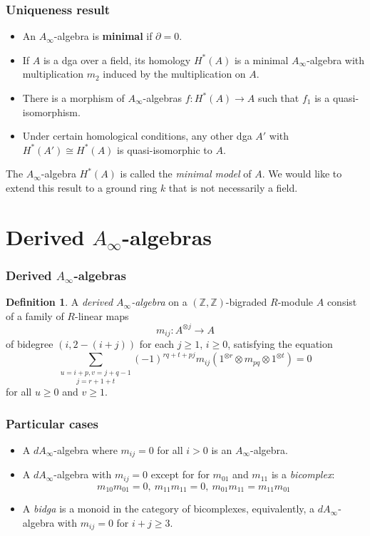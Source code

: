 \documentclass{beamer}
\theoremstyle{definition}
\newtheorem{defi}{Definition}
\newcommand{\Z}{\mathbb{Z}}
\begin{document}
\begin{frame}
\frametitle{Uniqueness result}
\begin{itemize}
\item An $A_\infty$-algebra is \textbf{minimal} if $\partial = 0$. 
\end{itemize}\pause
\begin{theorem}[Kadeishvili]
\begin{itemize}
\item If $A$ is a dga over a field, its homology $H^*(A)$ is a minimal $A_\infty$-algebra with multiplication $m_2$ induced by the multiplication on $A$.
\item There is a morphism of $A_\infty$-algebras $f:H^*(A)\to A$ such that $f_1$ is a quasi-isomorphism.
\item Under certain homological conditions, any other dga $A'$ with $H^*(A')\cong H^*(A)$ is quasi-isomorphic to $A$. 
\end{itemize}
\end{theorem}\pause
The $A_\infty$-algebra $H^*(A)$ is called the \emph{minimal model} of $A$.
We would like to extend this result to a ground ring $k$ that is not necessarily a field.
\end{frame}

\section{Derived $A_\infty$-algebras}

\begin{frame}
\frametitle{Derived $A_\infty$-algebras}
\begin{defi}
  A \emph{derived $A_\infty$-algebra} on a $(\Z,\Z)$-bigraded $R$-module $A$ consist of a family of $R$-linear maps 
\[m_{ij}:A^{\otimes j}\to A\]
of bidegree $(i,2-(i+j))$ for each $j\geq 1$, $i\geq 0$, satisfying the equation
\begin{equation}
\underset{j=r+1+t}{\sum_{u=i+p, v=j+q-1}}(-1)^{rq+t+pj}m_{ij}(1^{\otimes r}\otimes m_{pq}\otimes 1^{\otimes t})=0
\end{equation}
for all $u\geq 0$ and $v\geq 1$. 
\end{defi}
\end{frame}

\begin{frame}
\frametitle{Particular cases}
\begin{itemize}
\item<1-> A $dA_\infty$-algebra where $m_{ij}=0$ for all $i>0$ is an $A_\infty$-algebra.
\item<2-> A $dA_\infty$-algebra with $m_{ij}=0$ except for for $m_{01}$ and $m_{11}$ is a \emph{bicomplex}: 
\[m_{10}m_{01}=0,\ m_{11}m_{11}=0,\ m_{01}m_{11}=m_{11}m_{01}\]
\item<3-> A \emph{bidga} is a monoid in the category of bicomplexes, equivalently, a $dA_\infty$-algebra with $m_{ij}=0$ for $i+j\geq 3$.
\end{itemize}
\end{frame}
\end{document}
